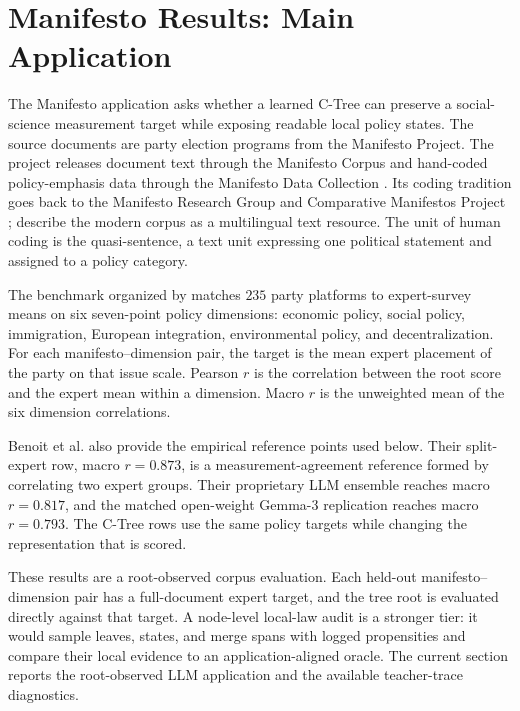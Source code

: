 \section{Manifesto Results: Main Application}
\label{sec:v8-manifesto-results}

The Manifesto application asks whether a learned C-Tree can preserve a
social-science measurement target while exposing readable local policy states.
The source documents are party election programs from the Manifesto Project.
The project releases document text through the Manifesto Corpus and
hand-coded policy-emphasis data through the Manifesto Data Collection
\citep{ManifestoProject2025a,ManifestoCorpus2025}. Its coding tradition goes
back to the Manifesto Research Group and Comparative Manifestos Project
\citep{BudgeRobertsonHearl1987,BudgeEtAl2001,KlingemannEtAl2006,VolkensEtAl2013};
\citet{MerzEtAl2016} describe the modern corpus as a multilingual text
resource. The unit of human coding is the quasi-sentence, a text unit
expressing one political statement and assigned to a policy category.

The benchmark organized by \citet{BenoitEtAl2025} matches \(235\) party
platforms to expert-survey means on six seven-point policy dimensions:
economic policy, social policy, immigration, European integration,
environmental policy, and decentralization. For each manifesto--dimension
pair, the target is the mean expert placement of the party on that issue
scale. Pearson \(r\) is the correlation between the root score and the expert
mean within a dimension. Macro \(r\) is the unweighted mean of the six
dimension correlations.

Benoit et al. also provide the empirical reference points used below. Their
split-expert row, macro \(r=0.873\), is a measurement-agreement reference
formed by correlating two expert groups. Their proprietary LLM ensemble reaches
macro \(r=0.817\), and the matched open-weight Gemma-3 replication reaches
macro \(r=0.793\). The C-Tree rows use the same policy targets while changing
the representation that is scored.

These results are a root-observed corpus evaluation. Each held-out
manifesto--dimension pair has a full-document expert target, and the tree root
is evaluated directly against that target. A node-level local-law audit is a
stronger tier: it would sample leaves, states, and merge spans with logged
propensities and compare their local evidence to an application-aligned
oracle. The current section reports the root-observed LLM application and the
available teacher-trace diagnostics.

